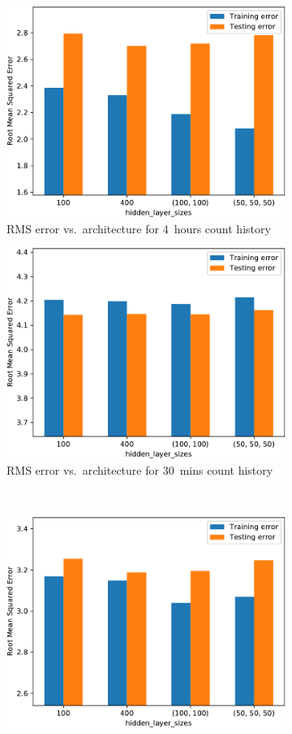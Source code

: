 \begin{figure}[!ht]
\begin{subfigure}[t]{.47\linewidth}
        \includegraphics[width=0.9\linewidth]{./figures/AplotA3.pdf}
        \caption{RMS error vs.~architecture for 4~hours count history}\label{AppAplotA3}
    \end{subfigure}\hfill%
    \begin{subfigure}[t]{.47\linewidth}\centering
        \includegraphics[width=0.9\linewidth]{./figures/AplotA4.pdf}
        \caption{RMS error vs.~architecture for 30~mins count history}\label{AppAplotA4}
    \end{subfigure}\\[5pt]
    \begin{subfigure}[t]{.47\linewidth}\centering
        \includegraphics[width=0.9\linewidth]{./figures/AplotA5.pdf}

\end{subfigure}
\end{figure}
